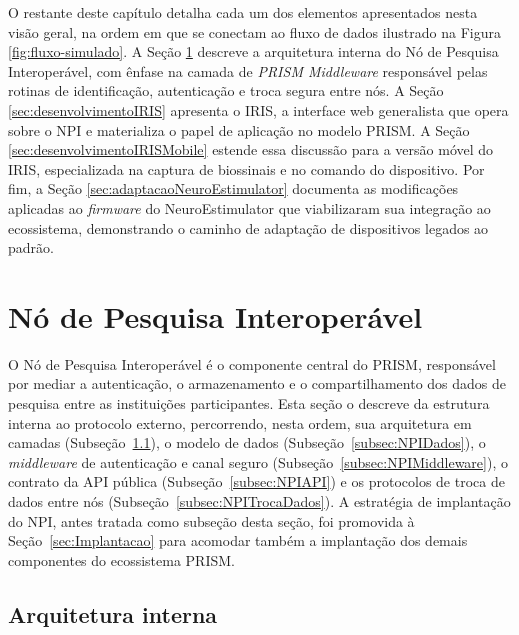 O restante deste capítulo detalha cada um dos elementos apresentados nesta visão geral, na ordem em que se conectam ao fluxo de dados ilustrado na Figura \ref{fig:fluxo-simulado}. A Seção \ref{sec:DesenvolvimentoNPI} descreve a arquitetura interna do Nó de Pesquisa Interoperável, com ênfase na camada de \textit{PRISM Middleware} responsável pelas rotinas de identificação, autenticação e troca segura entre nós. A Seção \ref{sec:desenvolvimentoIRIS} apresenta o IRIS, a interface web generalista que opera sobre o NPI e materializa o papel de aplicação no modelo PRISM. A Seção \ref{sec:desenvolvimentoIRISMobile} estende essa discussão para a versão móvel do IRIS, especializada na captura de biossinais e no comando do dispositivo. Por fim, a Seção \ref{sec:adaptacaoNeuroEstimulator} documenta as modificações aplicadas ao \textit{firmware} do NeuroEstimulator que viabilizaram sua integração ao ecossistema, demonstrando o caminho de adaptação de dispositivos legados ao padrão.

\section{Nó de Pesquisa Interoperável}\label{sec:DesenvolvimentoNPI}

O Nó de Pesquisa Interoperável \cite{prismNpiRepo} é o componente central do PRISM, responsável por mediar a autenticação, o armazenamento e o compartilhamento dos dados de pesquisa entre as instituições participantes. Esta seção o descreve da estrutura interna ao protocolo externo, percorrendo, nesta ordem, sua arquitetura em camadas (Subseção~\ref{subsec:NPIArquitetura}), o modelo de dados (Subseção~\ref{subsec:NPIDados}), o \textit{middleware} de autenticação e canal seguro (Subseção~\ref{subsec:NPIMiddleware}), o contrato da API pública (Subseção~\ref{subsec:NPIAPI}) e os protocolos de troca de dados entre nós (Subseção~\ref{subsec:NPITrocaDados}). A estratégia de implantação do NPI, antes tratada como subseção desta seção, foi promovida à Seção~\ref{sec:Implantacao} para acomodar também a implantação dos demais componentes do ecossistema PRISM.


\subsection{Arquitetura interna}\label{subsec:NPIArquitetura}

